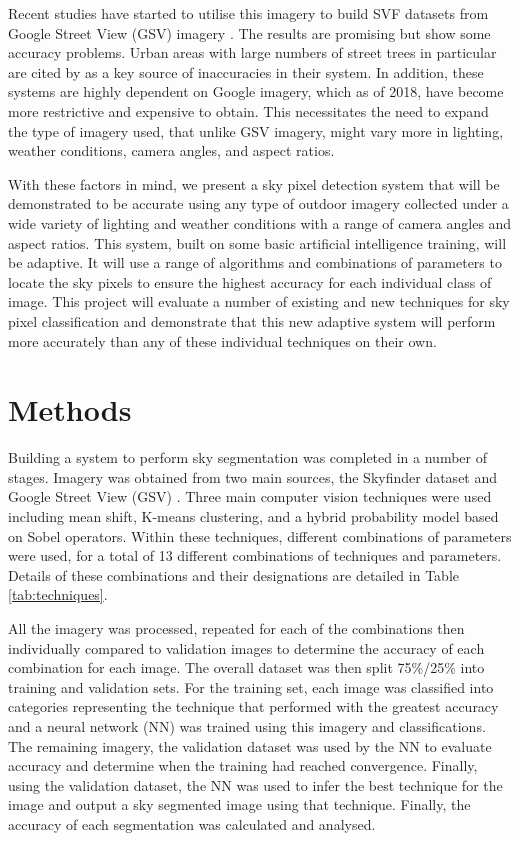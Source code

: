 \documentclass[final,3p,times,authoryear]{elsarticle}
\begin{document}
Recent studies have started to utilise this imagery to build SVF datasets from Google Street View (GSV) imagery \citep{Middel2018,Gong2018}. The results are promising but show some accuracy problems. Urban areas with large numbers of street trees in particular are cited by \cite{Gong2018} as a key source of inaccuracies in their system. In addition, these systems are highly dependent on Google imagery, which as of 2018, have become more restrictive and expensive to obtain. This necessitates the need to expand the type of imagery used, that unlike GSV imagery, might vary more in lighting, weather conditions, camera angles, and aspect ratios. 

With these factors in mind, we present a sky pixel detection system that will be demonstrated to be accurate using any type of outdoor imagery collected under a wide variety of lighting and weather conditions with a range of camera angles and aspect ratios. This system, built on some basic artificial intelligence training, will be adaptive. It will use a range of algorithms and combinations of parameters to locate the sky pixels to ensure the highest accuracy for each individual class of image. This project will evaluate a number of existing and new techniques for sky pixel classification and demonstrate that this new adaptive system will perform more accurately than any of these individual techniques on their own.



\section{Methods}\label{sec:Methods}

Building a system to perform sky segmentation was completed in a number of stages. Imagery was obtained from two main sources, the Skyfinder dataset \citep{Mihail2016} and Google Street View (GSV) \citep{GoogleMaps2017b}. Three main computer vision techniques were used including mean shift, K-means clustering, and a hybrid probability model based on Sobel operators. Within these techniques, different combinations of parameters were used, for a total of 13 different combinations of techniques and parameters. Details of these combinations and their designations are detailed in Table \ref{tab:techniques}.

All the imagery was processed, repeated for each of the combinations then individually compared to validation images to determine the accuracy of each combination for each image. The overall dataset was then split 75\%/25\% into training and validation sets. For the training set, each image was classified into categories representing the technique that performed with the greatest accuracy and a neural network (NN) was trained using this imagery and classifications. The remaining imagery, the validation dataset was used by the NN to evaluate accuracy and determine when the training had reached convergence. Finally, using the validation dataset, the NN was used to infer the best technique for the image and output a sky segmented image using that technique. Finally, the accuracy of each segmentation was calculated and analysed. 
\end{document}
